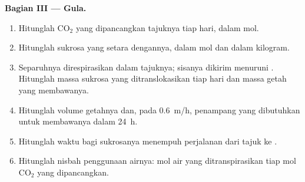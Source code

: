 \begin{problem}
\medskip
\noindent\textbf{Bagian III --- Gula.}
\begin{enumerate}[resume]
  \item Hitunglah $\mathrm{CO_2}$ yang dipancangkan tajuknya tiap hari,
        dalam mol.
  \item Hitunglah sukrosa yang setara dengannya, dalam mol dan dalam
        kilogram.
  \item Separuhnya direspirasikan dalam tajuknya; sisanya dikirim
        menuruni . Hitunglah massa sukrosa yang ditranslokasikan
        tiap hari dan massa getah yang membawanya.
  \item Hitunglah volume getahnya dan, pada \qty{0.6}{m/h}, penampang
         yang dibutuhkan untuk membawanya dalam \qty{24}{h}.
  \item Hitunglah waktu bagi sukrosanya menempuh perjalanan dari tajuk
        ke .
  \item Hitunglah nisbah penggunaan airnya: mol air yang
        ditranspirasikan tiap mol $\mathrm{CO_2}$ yang dipancangkan.
\end{enumerate}


\end{problem}
